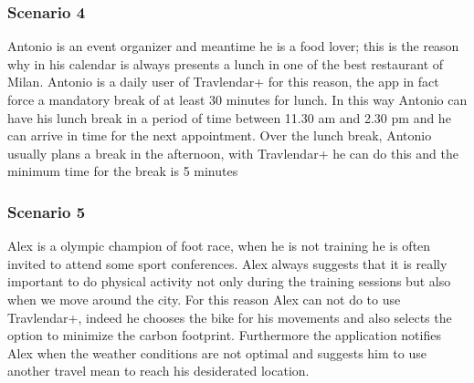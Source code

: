 \subsubsection{Scenario 4}
Antonio is an event organizer and meantime he is a food lover; this is the reason why in his calendar is always presents a lunch in one of the best restaurant of Milan. Antonio is a daily user of Travlendar+ for this reason, the app in fact force a mandatory break of at least 30 minutes for lunch. In this way Antonio can have his lunch break in a period of time between 11.30 am and 2.30 pm and he can arrive in time for the next appointment. Over the lunch break, Antonio usually plans a break in the afternoon, with Travlendar+ he can do this and the minimum time for the break is 5 minutes

\subsubsection{Scenario 5}
Alex is a olympic champion of foot race, when he is not training he is often invited to attend some sport conferences. Alex always suggests that it is really important to do physical activity not only during the training sessions but also when we move around the city. For this reason Alex can not do to use Travlendar+, indeed he chooses the bike for his movements and also selects the option to minimize the carbon footprint. Furthermore the application notifies Alex when the weather conditions are not optimal and suggests him to use another travel mean to reach his desiderated location.
